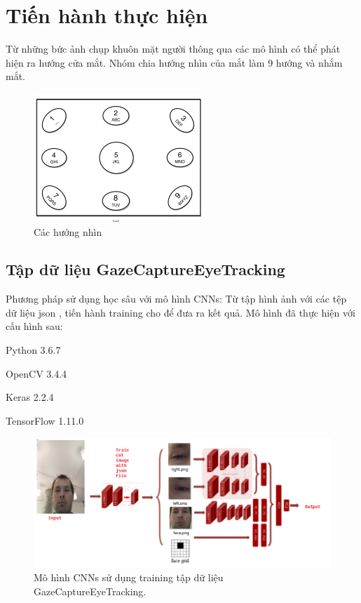 \section{Tiến hành thực hiện}

	Từ những bức ảnh chụp khuôn mặt người thông qua các mô hình có thể phát hiện ra hướng cửa mắt. Nhóm chia hướng nhìn của mắt làm 9 hướng và nhắm mắt.

\begin{center}
    \begin{figure}[h!]
    \begin{center}
     \includegraphics[scale=0.8]{img/direction.png}
    \end{center}
    \caption{Các hướng nhìn \cite{9direction}}
    \label{refhinh21}
    \end{figure}
\end{center}



\newpage 
\subsection{Tập dữ liệu GazeCaptureEyeTracking}
Phương pháp sử dụng học sâu với mô hình CNNs: Từ tập  hình ảnh với các tệp dữ liệu json , tiến hành training cho để đưa ra kết quả. Mô hình đã thực hiện với cấu hình sau:

    Python 3.6.7
    
    OpenCV 3.4.4
    
    Keras 2.2.4
    
    TensorFlow 1.11.0

 \begin{center}
    \begin{figure}[h!]
    \begin{center}
     \includegraphics[scale=0.7]{img/mohinhtrain1.png}
    \end{center}
    \caption{Mô hình CNNs sử dụng training tập dữ liệu GazeCaptureEyeTracking.}
    \label{refhinh20}
    \end{figure}
\end{center}



